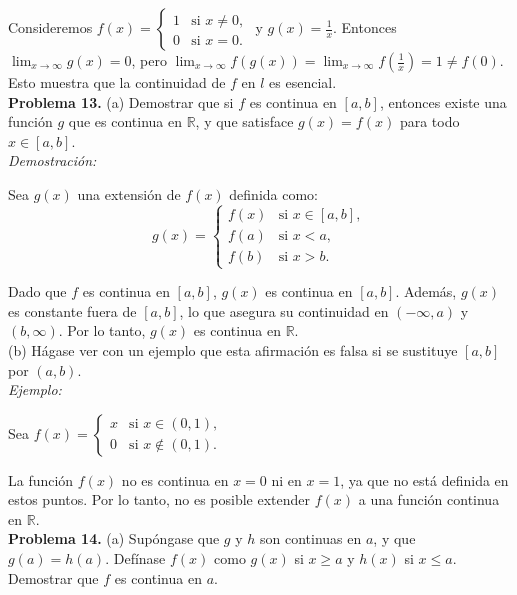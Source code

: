 Consideremos $f(x) = \begin{cases} 1 & \text{si } x \neq 0, \\ 0 & \text{si } x = 0. \end{cases}$ y $g(x) = \frac{1}{x}$. Entonces $\lim_{x \to \infty} g(x) = 0$, pero $\lim_{x \to \infty} f(g(x)) = \lim_{x \to \infty} f\left(\frac{1}{x}\right) = 1 \neq f(0)$. Esto muestra que la continuidad de $f$ en $l$ es esencial.\\

\textbf{Problema 13.} (a) Demostrar que si $f$ es continua en $[a, b]$, entonces existe una función $g$ que es continua en $\mathbb{R}$, y que satisface $g(x) = f(x)$ para todo $x \in [a, b]$.\\

\textit{Demostración:}

Sea $g(x)$ una extensión de $f(x)$ definida como:
\[
g(x) = \begin{cases}
f(x) & \text{si } x \in [a, b], \\
f(a) & \text{si } x < a, \\
f(b) & \text{si } x > b.
\end{cases}
\]

Dado que $f$ es continua en $[a, b]$, $g(x)$ es continua en $[a, b]$. Además, $g(x)$ es constante fuera de $[a, b]$, lo que asegura su continuidad en $(-\infty, a)$ y $(b, \infty)$. Por lo tanto, $g(x)$ es continua en $\mathbb{R}$.\\

(b) Hágase ver con un ejemplo que esta afirmación es falsa si se sustituye $[a, b]$ por $(a, b)$.\\

\textit{Ejemplo:}

Sea $f(x) = \begin{cases} x & \text{si } x \in (0, 1), \\ 0 & \text{si } x \notin (0, 1). \end{cases}$

La función $f(x)$ no es continua en $x = 0$ ni en $x = 1$, ya que no está definida en estos puntos. Por lo tanto, no es posible extender $f(x)$ a una función continua en $\mathbb{R}$.\\

\textbf{Problema 14.} (a) Supóngase que $g$ y $h$ son continuas en $a$, y que $g(a) = h(a)$. Defínase $f(x)$ como $g(x)$ si $x \geq a$ y $h(x)$ si $x \leq a$. Demostrar que $f$ es continua en $a$.\\

